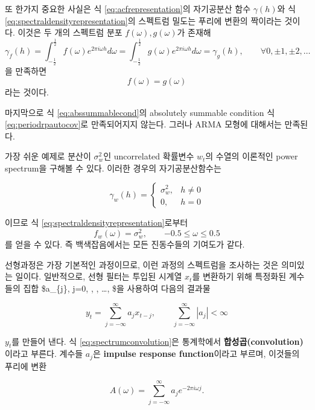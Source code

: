\documentclass[b5paper,]{scrbook}
\theoremstyle{plain}
\theoremstyle{definition}
\numberwithin{equation}{section}
\let\BeginKnitrBlock\begin \let\EndKnitrBlock\end
\begin{document}
또 한가지 중요한 사실은 식 \eqref{eq:acfrepresentation}의 자기공분산 함수 \(\gamma(h)\)와 식 \eqref{eq:spectraldensityrepresentation}의 스펙트럼 밀도는 푸리에 변환의 짝이라는 것이다. 이것은 두 개의 스펙트럼 분포 \(f(\omega),g(\omega)\)가 존재해
\[\gamma_{f}(h)=\int_{-\frac{1}{2}}^{\frac{1}{2}}f(\omega)e^{2\pi i\omega h}d\omega = \int_{-\frac{1}{2}}^{\frac{1}{2}}g(\omega)e^{2\pi i\omega h}d\omega =\gamma_{g}(h), \qquad{\forall 0,\pm1, \pm2,\ldots}\]
을 만족하면
\[f(\omega)=g(\omega)\]
라는 것이다.

마지막으로 식 \eqref{eq:abssummablecond}의 absolutely summable condition 식 \eqref{eq:periodrpautocov}로 만족되어지지 않는다. 그러나 ARMA 모형에 대해서는 만족된다.

\BeginKnitrBlock{example}[백색잡음의 스펙트럼]
\protect\hypertarget{exm:unnamed-chunk-239}{}{\label{exm:unnamed-chunk-239} {} }가장 쉬운 예제로 분산이 \(\sigma_{w}^{2}\)인 uncorrelated 확률변수 \(w_{t}\)의 수열의 이론적인 power spectrum을 구해볼 수 있다. 이러한 경우의 자기공분산함수는

\[
\gamma_{w}(h)=
\begin{cases}
\sigma_{w}^{2}, & h\neq 0\\
0, & h=0
\end{cases}
\]

이므로 식 \eqref{eq:spectraldensityrepresentation}로부터
\[f_{w}(\omega)=\sigma_{w}^{2}, \qquad{-0.5\leq \omega \leq 0.5}\]
를 얻을 수 있다. 즉 백색잡음에서는 모든 진동수들의 기여도가 같다.
\EndKnitrBlock{example}

선형과정은 가장 기본적인 과정이므로, 이런 과정의 스펙트럼을 조사하는 것은 의미있는 일이다. 일반적으로, 선형 필터는 투입된 시계열 \(x_{t}\)를 변환하기 위해 특정화된 계수들의 집합 \$a\_\{j\}, j=0, , , \ldots, \$을 사용하여 다음의 결과물

\begin{equation}
y_{t} =\sum_{j=-\infty}^{\infty}a_{j}x_{t-j}, \qquad{\sum_{j=-\infty}^{\infty}}|a_{j}|<\infty
\label{eq:spectrumconvolution}
\end{equation}

\(y_{t}\)를 만들어 낸다. 식 \eqref{eq:spectrumconvolution}은 통계학에서 \textbf{합성곱(convolution)}이라고 부른다. 계수들 \(a_{j}\)은 \textbf{impulse response function}이라고 부르며, 이것들의 푸리에 변환

\begin{equation}
A(\omega) = \sum_{j=-\infty}^{\infty}a_{j}e^{-2\pi i \omega j}.
\label{eq:IRFFourier}
\end{equation}
\end{document}
